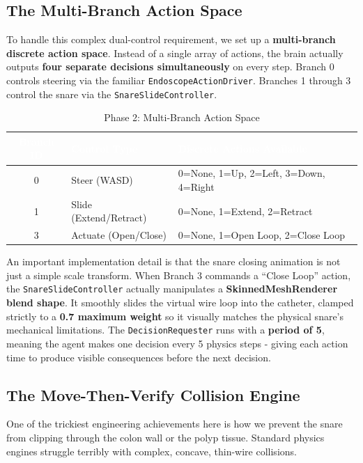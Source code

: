 \subsection{The Multi-Branch Action Space}
To handle this complex dual-control requirement, we set up a \textbf{multi-branch discrete action space}. Instead of a single array of actions, the brain actually outputs \textbf{four separate decisions simultaneously} on every step. Branch 0 controls steering via the familiar \texttt{EndoscopeActionDriver}. Branches 1 through 3 control the snare via the \texttt{SnareSlideController}.

\begin{table}[H]
\centering
\caption{Phase 2: Multi-Branch Action Space}
\label{tab:p2_actions}
\begin{tabular}{|c|l|l|}
\rowcolor{primary}
\textcolor{white}{\textbf{Branch ID}} & \textcolor{white}{\textbf{Control Type}} & \textcolor{white}{\textbf{Discrete Actions Available}} \\
\hline
0 & Steer (WASD) & 0=None, 1=Up, 2=Left, 3=Down, 4=Right \\
\hline
1 & Slide (Extend/Retract) & 0=None, 1=Extend, 2=Retract \\
\hline
3 & Actuate (Open/Close) & 0=None, 1=Open Loop, 2=Close Loop \\
\hline
\end{tabular}
\end{table}

An important implementation detail is that the snare closing animation is not just a simple scale transform. When Branch 3 commands a ``Close Loop'' action, the \texttt{SnareSlideController} actually manipulates a \textbf{SkinnedMeshRenderer blend shape}. It smoothly slides the virtual wire loop into the catheter, clamped strictly to a \textbf{0.7 maximum weight} so it visually matches the physical snare's mechanical limitations. The \texttt{DecisionRequester} runs with a \textbf{period of 5}, meaning the agent makes one decision every 5 physics steps - giving each action time to produce visible consequences before the next decision.

\subsection{The Move-Then-Verify Collision Engine}
One of the trickiest engineering achievements here is how we prevent the snare from clipping through the colon wall or the polyp tissue. Standard physics engines struggle terribly with complex, concave, thin-wire collisions.

